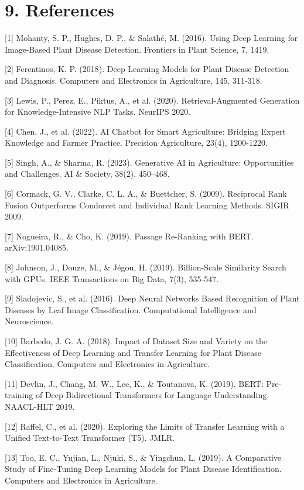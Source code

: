 \section*{9. References}\label{references}

{[}1{]} Mohanty, S. P., Hughes, D. P., \& Salathé, M. (2016). Using Deep
Learning for Image-Based Plant Disease Detection. Frontiers in Plant
Science, 7, 1419.

{[}2{]} Ferentinos, K. P. (2018). Deep Learning Models for Plant Disease
Detection and Diagnosis. Computers and Electronics in Agriculture, 145,
311-318.

{[}3{]} Lewis, P., Perez, E., Piktus, A., et al. (2020).
Retrieval-Augmented Generation for Knowledge-Intensive NLP Tasks.
NeurIPS 2020.

{[}4{]} Chen, J., et al. (2022). AI Chatbot for Smart Agriculture:
Bridging Expert Knowledge and Farmer Practice. Precision Agriculture,
23(4), 1200-1220.

{[}5{]} Singh, A., \& Sharma, R. (2023). Generative AI in Agriculture:
Opportunities and Challenges. AI \& Society, 38(2), 450--468.

{[}6{]} Cormack, G. V., Clarke, C. L. A., \& Buettcher, S. (2009).
Reciprocal Rank Fusion Outperforms Condorcet and Individual Rank
Learning Methods. SIGIR 2009.

{[}7{]} Nogueira, R., \& Cho, K. (2019). Passage Re-Ranking with BERT.
arXiv:1901.04085.

{[}8{]} Johnson, J., Douze, M., \& Jégou, H. (2019). Billion-Scale
Similarity Search with GPUs. IEEE Transactions on Big Data, 7(3),
535-547.

{[}9{]} Sladojevic, S., et al. (2016). Deep Neural Networks Based
Recognition of Plant Diseases by Leaf Image Classification.
Computational Intelligence and Neuroscience.

{[}10{]} Barbedo, J. G. A. (2018). Impact of Dataset Size and Variety on
the Effectiveness of Deep Learning and Transfer Learning for Plant
Disease Classification. Computers and Electronics in Agriculture.

{[}11{]} Devlin, J., Chang, M. W., Lee, K., \& Toutanova, K. (2019).
BERT: Pre-training of Deep Bidirectional Transformers for Language
Understanding. NAACL-HLT 2019.

{[}12{]} Raffel, C., et al. (2020). Exploring the Limits of Transfer
Learning with a Unified Text-to-Text Transformer (T5). JMLR.

{[}13{]} Too, E. C., Yujian, L., Njuki, S., \& Yingchun, L. (2019). A
Comparative Study of Fine-Tuning Deep Learning Models for Plant Disease
Identification. Computers and Electronics in Agriculture.

